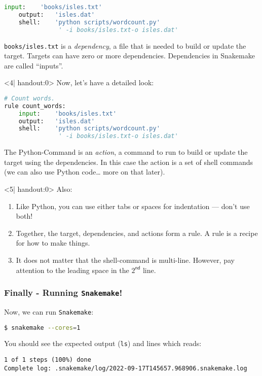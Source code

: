 \begin{frame}[fragile]
\begin{onlyenv}
\begin{lstlisting}[language=Python,style=Python]
    input:    'books/isles.txt'
    output:   'isles.dat'
    shell:    'python scripts/wordcount.py' 
               ' -i books/isles.txt-o isles.dat'
    \end{lstlisting}
    \texttt{books/isles.txt} is a \emph{dependency}, a file that is needed to build or update the target. Targets can have zero or more dependencies. Dependencies in Snakemake are called “inputs”.
  \end{onlyenv}
  \begin{onlyenv}<4| handout:0>
   Now, let's have a detailed look:
   \begin{lstlisting}[language=Python,style=Python]
# Count words.
rule count_words:
    input:    'books/isles.txt'
    output:   'isles.dat'
    shell:    'python scripts/wordcount.py' 
               ' -i books/isles.txt-o isles.dat'
    \end{lstlisting}
    The Python-Command is an \emph{action}, a command to run to build or update the target using the dependencies. In this case the action is a set of shell commands (we can also use Python code… more on that later).
  \end{onlyenv}
  \begin{onlyenv}<5| handout:0>
  Also:
  \begin{enumerate}
   \item Like Python, you can use either tabs or spaces for indentation — don’t use both!
   \item Together, the target, dependencies, and actions form a rule. A rule is a recipe for how to make things.
   \item It does not matter that the shell-command is multi-line. However, pay attention to the leading space in the $2^\mathsf{nd}$ line.
  \end{enumerate}
  \end{onlyenv}
\end{frame}

\begin{frame}[fragile]
  \frametitle{Finally - Running \texttt{Snakemake}!}
  Now, we can run \texttt{Snakemake}:
  \begin{lstlisting}[language=Bash, style=Shell]
$ snakemake --cores=1
  \end{lstlisting}
  You should see the expected output (\texttt{ls}) and lines which reads:
  \begin{lstlisting}[style=Plain, basicstyle=\footnotesize]
1 of 1 steps (100%) done
Complete log: .snakemake/log/2022-09-17T145657.968906.snakemake.log
  \end{lstlisting}
\end{frame}

